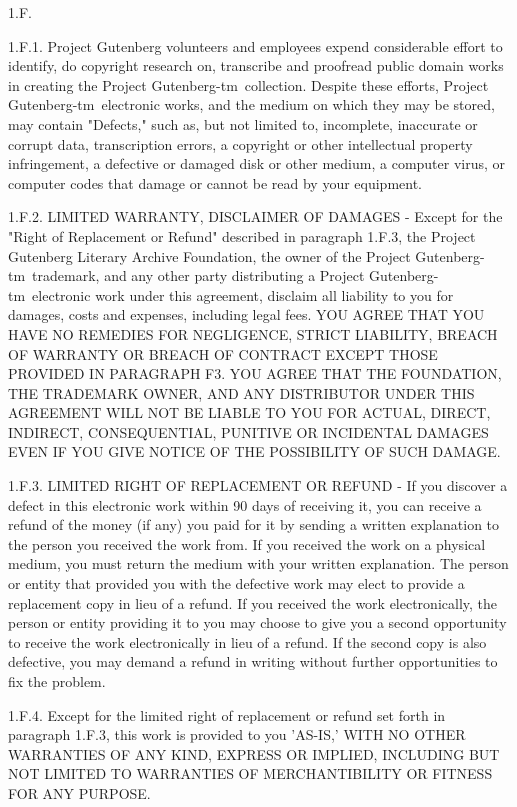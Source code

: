 \documentclass[11pt]{book}
\newcommand{\pgtm}{Project \mbox{Gutenberg-tm}}
\begin{document}
{\smallskip\noindent 1.F.

\smallskip\noindent 1.F.1.  Project Gutenberg volunteers and employees expend considerable
effort to identify, do copyright research on, transcribe and proofread
public domain works in creating the
\pgtm\ collection.  Despite these efforts, \pgtm\ electronic
works, and the medium on which they may be stored, may contain
"Defects," such as, but not limited to, incomplete, inaccurate or
corrupt data, transcription errors, a copyright or other intellectual
property infringement, a defective or damaged disk or other medium, a
computer virus, or computer codes that damage or cannot be read by
your equipment.

\smallskip\noindent 1.F.2.  LIMITED WARRANTY, DISCLAIMER OF DAMAGES - Except for the "Right
of Replacement or Refund" described in paragraph 1.F.3, the Project
Gutenberg Literary Archive Foundation, the owner of the
\pgtm\ trademark, and any other party distributing a
\pgtm\ electronic work under this agreement, disclaim all
liability to you for damages, costs and expenses, including legal
fees.  YOU AGREE THAT YOU HAVE NO REMEDIES FOR NEGLIGENCE, STRICT
LIABILITY, BREACH OF WARRANTY OR BREACH OF CONTRACT EXCEPT THOSE
PROVIDED IN PARAGRAPH F3.  YOU AGREE THAT THE FOUNDATION, THE
TRADEMARK OWNER, AND ANY DISTRIBUTOR UNDER THIS AGREEMENT WILL NOT BE
LIABLE TO YOU FOR ACTUAL, DIRECT, INDIRECT, CONSEQUENTIAL, PUNITIVE OR
INCIDENTAL DAMAGES EVEN IF YOU GIVE NOTICE OF THE POSSIBILITY OF SUCH
DAMAGE.

\smallskip\noindent 1.F.3.  LIMITED RIGHT OF REPLACEMENT OR REFUND - If you discover a
defect in this electronic work within 90 days of receiving it, you can
receive a refund of the money (if any) you paid for it by sending a
written explanation to the person you received the work from.  If you
received the work on a physical medium, you must return the medium with
your written explanation.  The person or entity that provided you with
the defective work may elect to provide a replacement copy in lieu of a
refund.  If you received the work electronically, the person or entity
providing it to you may choose to give you a second opportunity to
receive the work electronically in lieu of a refund.  If the second copy
is also defective, you may demand a refund in writing without further
opportunities to fix the problem.

\smallskip\noindent 1.F.4.  Except for the limited right of replacement or refund set forth
in paragraph 1.F.3, this work is provided to you 'AS-IS,' WITH NO OTHER
WARRANTIES OF ANY KIND, EXPRESS OR IMPLIED, INCLUDING BUT NOT LIMITED TO
WARRANTIES OF MERCHANTIBILITY OR FITNESS FOR ANY PURPOSE.

}
\end{document}
